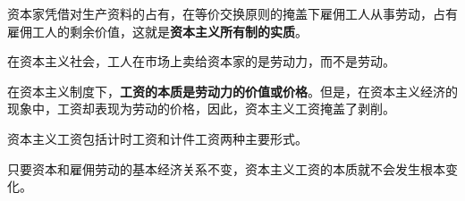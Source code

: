 资本家凭借对生产资料的占有，在等价交换原则的掩盖下雇佣工人从事劳动，占有雇佣工人的剩余价值，这就是\textbf{{资本主义所有制的实质}}。

在资本主义社会，工人在市场上卖给资本家的是劳动力，而不是劳动。

在资本主义制度下，\textbf{工资的本质是劳动力的价值或价格}。但是，在资本主义经济的现象中，工资却表现为劳动的价格，因此，资本主义工资掩盖了剥削。

资本主义工资包括计时工资和计件工资两种主要形式。

只要资本和雇佣劳动的基本经济关系不变，资本主义工资的本质就不会发生根本变化{。}
